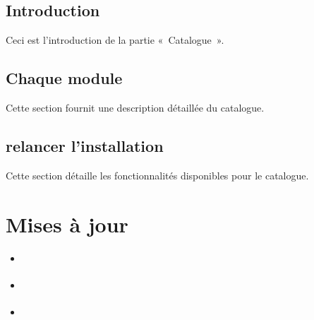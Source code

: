 \documentclass[letterpaper,10pt,french]{sphinxmanual}
\begin{document}
\subsection{Introduction}
\label{\detokenize{doc_instal/configuration:introduction}}
\sphinxAtStartPar
Ceci est l’introduction de la partie « Catalogue ».


\subsection{Chaque module}
\label{\detokenize{doc_instal/configuration:chaque-module}}
\sphinxAtStartPar
Cette section fournit une description détaillée du catalogue.


\subsection{relancer l’installation}
\label{\detokenize{doc_instal/configuration:relancer-l-installation}}
\sphinxAtStartPar
Cette section détaille les fonctionnalités disponibles pour le catalogue.

\sphinxstepscope


\section{Mises à jour}
\label{\detokenize{doc_instal/maj:mises-a-jour}}\label{\detokenize{doc_instal/maj::doc}}
\begin{sphinxShadowBox}
\begin{itemize}
\item {} 
\sphinxAtStartPar
{}\label{\detokenize{doc_instal/maj:id1}}{\hyperref[\detokenize{doc_instal/maj:introduction}]{}}

\item {} 
\sphinxAtStartPar
{}\label{\detokenize{doc_instal/maj:id2}}{\hyperref[\detokenize{doc_instal/maj:paquets-debians}]{}}

\item {} 
\sphinxAtStartPar
{}\label{\detokenize{doc_instal/maj:id3}}{\hyperref[\detokenize{doc_instal/maj:directements-avec-l-installation-donc-georchestra-yml}]{}}

\end{itemize}
\end{sphinxShadowBox}
\end{document}
